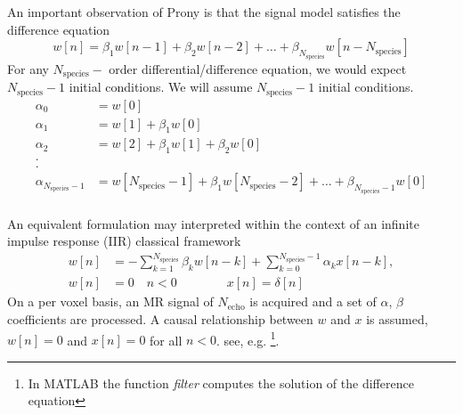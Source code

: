 \documentclass[10pt]{amsart}
\begin{document}
An important observation of Prony is that the signal model satisfies the difference equation
\[
  w[n] = \beta_1 w[n-1] + \beta_2 w[n-2] + \dots + \beta_{N_\text{species}} w[n-N_\text{species}] 
\]
For any $N_\text{species}-$ order differential/difference equation, we would expect 
$N_\text{species}-1$ initial conditions. We will assume $N_\text{species}-1$ initial conditions.
\[ \begin{split}
 \alpha_0                    & =  w[0]                                  \\
 \alpha_1                    & =  w[1] + \beta_1 w[0]                   \\
 \alpha_2                    & =  w[2] + \beta_1 w[1] + \beta_2 w[0]    \\
  .                                                   \\
  .                                                   \\
 \alpha_{N_\text{species}-1} & =  w[N_\text{species}-1] + \beta_1 w[N_\text{species}-2] + \dots +  \beta_{N_\text{species}-1} w[0]\\
 \end{split} \]

An equivalent formulation may interpreted within the context of an infinite
impulse response (IIR) classical framework
\begin{equation} \label{eq:filter_t}
 \begin{split}
	 w[n]  & = - \sum\limits_{k=1}^{N_\text{species}} \beta_k w[n-k] + \sum\limits_{k=0}^{N_\text{species}-1} \alpha_k x[n-k],
   \\
         w[n]  & = 0  \quad  n < 0  \qquad\qquad  x[n]  = \delta[n]
 \end{split}
\end{equation}
On a per voxel basis,
an MR signal of $N_\text{echo}$ is acquired and a set of $\alpha$, $\beta$ 
coefficients are processed. 
A causal relationship between $w$ and $x$ is assumed, $w[n]=0$ and $x[n]=0$ for all $n<0$. 
see, e.g. \cite{Oppenheim1975}\footnote{In MATLAB the function {\it filter}
computes the solution of the difference equation}. 
\end{document}
